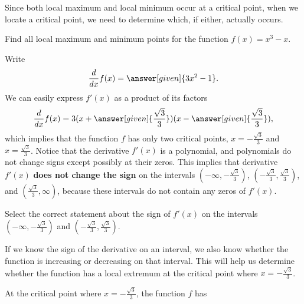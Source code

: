 \documentclass{ximera}
\begin{document}
Since both local maximum and
local minimum occur at a critical point, when we locate a critical point, we need to determine which, if either,
actually occurs. 
\begin{example}
Find all local maximum and minimum points for the function 
$f(x)=x^3-x$. 
\begin{explanation} 
Write
\[
\ddx f(x)=\answer[given]{3x^2-1}.
\] 
We can easily express  $f'(x)$ as a product of its factors
\[
\ddx f(x)=3(x+\answer[given]{\frac{\sqrt{3}}{3}})(x-\answer[given]{\frac{\sqrt{3}}{3}}),
\] 
which implies that the function $f$ has only two critical points, $x=-\frac{\sqrt{3}}{3}$ and  $x=\frac{\sqrt{3}}{3}$. Notice that the derivative $f'(x)$ is a polynomial, and polynomials do not change signs except possibly at their zeros. This implies that derivative $f'(x)$ \textbf{does not change the sign} on the intervals $(-\infty,-\frac{\sqrt{3}}{3})$, $(-\frac{\sqrt{3}}{3},\frac{\sqrt{3}}{3})$, and $(\frac{\sqrt{3}}{3},\infty)$, because these intervals do not contain any zeros of $f'(x)$.
 
\begin{question}
Select the correct  statement about the sign of $f'(x)$ on the intervals $(-\infty,-\frac{\sqrt{3}}{3})$ and $(-\frac{\sqrt{3}}{3},\frac{\sqrt{3}}{3})$. \\
 
  \begin{multipleChoice}
            \end{multipleChoice}
  \end{question}
  If we know the sign of the derivative on an interval, we also know whether the function is increasing or decreasing on that interval. This will help us determine whether the function has a local extremum at the critical point  where $x=-\frac{\sqrt{3}}{3}$. \\
  \begin{question}

At the critical point where $x=-\frac{\sqrt{3}}{3}$, the function $f$ has  \\
 

\end{question}
\end{explanation}
\end{example}
\end{document}

